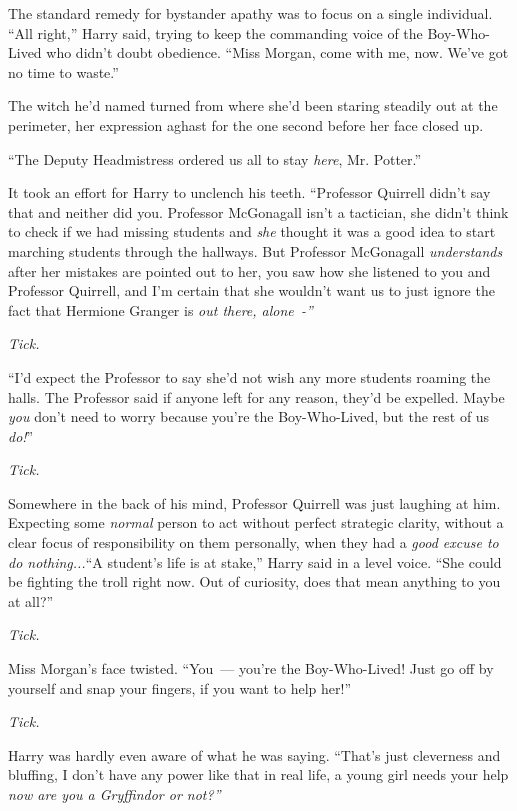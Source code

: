 The standard remedy for bystander apathy was to focus on a single individual. ``All right,'' Harry said, trying to keep the commanding voice of the Boy-Who-Lived who didn't doubt obedience. ``Miss Morgan, come with me, now. We've got no time to waste.''

The witch he'd named turned from where she'd been staring steadily out at the perimeter, her expression aghast for the one second before her face closed up.

``The Deputy Headmistress ordered us all to stay \emph{here}, Mr. Potter.''

It took an effort for Harry to unclench his teeth. ``Professor Quirrell didn't say that and neither did you. Professor McGonagall isn't a tactician, she didn't think to check if we had missing students and \emph{she} thought it was a good idea to start marching students through the hallways. But Professor McGonagall \emph{understands} after her mistakes are pointed out to her, you saw how she listened to you and Professor Quirrell, and I'm certain that she wouldn't want us to just ignore the fact that Hermione Granger is \emph{out there, alone~-''}

\emph{Tick.}

``I'd expect the Professor to say she'd not wish any more students roaming the halls. The Professor said if anyone left for any reason, they'd be expelled. Maybe \emph{you} don't need to worry because you're the Boy-Who-Lived, but the rest of us \emph{do!}''

\emph{Tick.}

Somewhere in the back of his mind, Professor Quirrell was just laughing at him. Expecting some \emph{normal} person to act without perfect strategic clarity, without a clear focus of responsibility on them personally, when they had a \emph{good excuse to do nothing...}``A student's life is at stake,'' Harry said in a level voice. ``She could be fighting the troll right now. Out of curiosity, does that mean anything to you at all?''

\emph{Tick.}

Miss Morgan's face twisted. ``You~--- you're the Boy-Who-Lived! Just go off by yourself and snap your fingers, if you want to help her!''

\emph{Tick.}

Harry was hardly even aware of what he was saying. ``That's just cleverness and bluffing, I don't have any power like that in real life, a young girl needs your help \emph{now are you a Gryffindor or not?''}

